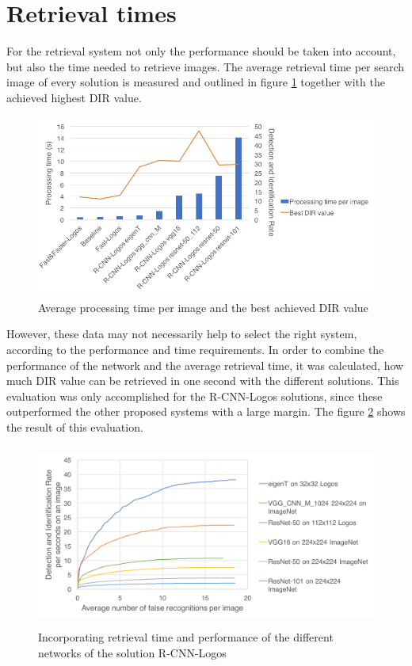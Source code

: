 \section{Retrieval times}
For the retrieval system not only the performance should be taken into account, but also the time needed to retrieve images. The average retrieval time per search image of every solution is measured and outlined in figure \ref{f:timebestdir} together with the achieved highest DIR value.
\begin{figure}
  \centering
  \includegraphics[height=60mm]{images/mt/timebestdir.jpg}
  \caption{Average processing time per image and the best achieved DIR value}
  \label{f:timebestdir}
\end{figure}
However, these data may not necessarily help to select the right system, according to the performance and time requirements. In order to combine the performance of the network and the average retrieval time, it was calculated, how much DIR value can be retrieved in one second with the different solutions. This evaluation was only accomplished for the R-CNN-Logos solutions, since these outperformed the other proposed systems with a large margin. The figure \ref{f:dirpertime} shows the result of this evaluation.
\begin{figure}
  \centering
  \includegraphics[height=60mm]{images/mt/dirpertime.png}
  \caption{Incorporating retrieval time and performance of the different networks of the solution R-CNN-Logos}
  \label{f:dirpertime}
\end{figure}